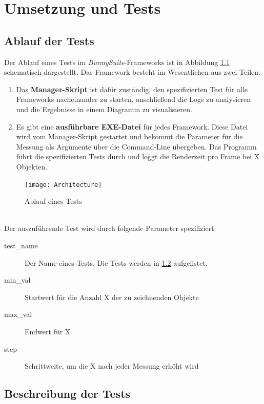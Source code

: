 \chapter{Umsetzung und Tests}

\section{Ablauf der Tests}
Der Ablauf eines Tests im \textit{BunnySuite}-Frameworks ist in Abbildung \ref{dia:architecture} schematisch dargestellt. Das Framework besteht im Wesentlichen aus zwei Teilen: 
\begin{enumerate}
\item Das \textbf{Manager-Skript} ist dafür zuständig, den spezifizierten Test für alle Frameworks nacheinander zu starten, anschließend die Logs zu analysieren und die Ergebnisse in einem Diagramm zu visualisieren.
\item Es gibt eine \textbf{ausführbare EXE-Datei} für jedes Framework. Diese Datei wird vom Manager-Skript gestartet und bekommt die Parameter für die Messung als Argumente über die Command-Line übergeben. Das Programm führt die spezifizierten Tests durch und loggt die Renderzeit pro Frame bei X Objekten.
\end{enumerate}
\begin{figure}[h]
\caption{Ablauf eines Tests}
\centering
\texttt{[image: Architecture]}
\label{dia:architecture}
\end{figure}
~\\
Der auszuführende Test wird durch folgende Parameter spezifiziert:\\
\begin{description}
\item[test\_name] Der Name eines Tests. Die Tests werden in \ref{sec:tests} aufgelistet.
\item[min\_val] Startwert für die Anzahl X der zu zeichnenden Objekte
\item[max\_val] Endwert für X
\item[step] Schrittweite, um die X nach jeder Messung erhöht wird
\end{description}

\section{Beschreibung der Tests}
\label{sec:tests}

